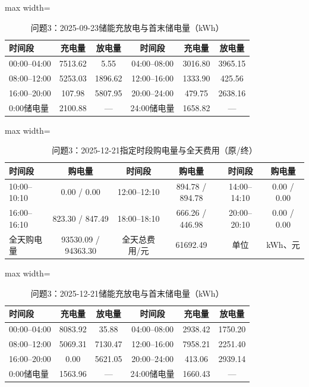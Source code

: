 \documentclass[UTF8,a4paper,zihao=-4,fontset=windows]{ctexart}
\begin{document}
\begin{table}[H]\centering\caption{问题3：2025-09-23储能充放电与首末储电量（kWh）}
\fontsize{9.5}{12}\selectfont\setlength{\tabcolsep}{4pt}\renewcommand{\arraystretch}{1.12}
\begin{adjustbox}{max width=\linewidth}\begin{tabular}{lccccc}\toprule
时间段 & 充电量 & 放电量 & 时间段 & 充电量 & 放电量\\\midrule
00:00–04:00 & 7513.62 & 5.55 & 04:00–08:00 & 3016.80 & 3965.15\\
08:00–12:00 & 5253.03 & 1896.62 & 12:00–16:00 & 1333.90 & 425.56\\
16:00–20:00 & 107.98 & 5807.95 & 20:00–24:00 & 479.75 & 2638.16\\
0:00储电量 & 2100.88 & — & 24:00储电量 & 1658.82 & —\\
\bottomrule\end{tabular}\end{adjustbox}\end{table}
\begin{table}[H]\centering\caption{问题3：2025-12-21指定时段购电量与全天费用（原/终）}
\fontsize{9.5}{12}\selectfont\setlength{\tabcolsep}{4pt}\renewcommand{\arraystretch}{1.12}
\begin{adjustbox}{max width=\linewidth}\begin{tabular}{lccccc}\toprule
时间段 & 购电量 & 时间段 & 购电量 & 时间段 & 购电量\\\midrule
10:00–10:10 & 0.00 / 0.00 & 12:00–12:10 & 894.78 / 894.78 & 14:00–14:10 & 0.00 / 0.00\\
16:00–16:10 & 823.30 / 847.49 & 18:00–18:10 & 666.26 / 446.98 & 20:00–20:10 & 0.00 / 0.00\\
全天购电量 & 93530.09 / 94363.30 & 全天总费用/元 & 61692.49 & 单位 & kWh、元\\
\bottomrule\end{tabular}\end{adjustbox}\end{table}
\begin{table}[H]\centering\caption{问题3：2025-12-21储能充放电与首末储电量（kWh）}
\fontsize{9.5}{12}\selectfont\setlength{\tabcolsep}{4pt}\renewcommand{\arraystretch}{1.12}
\begin{adjustbox}{max width=\linewidth}\begin{tabular}{lccccc}\toprule
时间段 & 充电量 & 放电量 & 时间段 & 充电量 & 放电量\\\midrule
00:00–04:00 & 8083.92 & 35.88 & 04:00–08:00 & 2938.42 & 1750.20\\
08:00–12:00 & 5069.31 & 7130.47 & 12:00–16:00 & 7958.21 & 2251.40\\
16:00–20:00 & 0.00 & 5621.05 & 20:00–24:00 & 413.06 & 2939.14\\
0:00储电量 & 1563.96 & — & 24:00储电量 & 1660.43 & —\\
\bottomrule\end{tabular}\end{adjustbox}\end{table}
\end{document}

